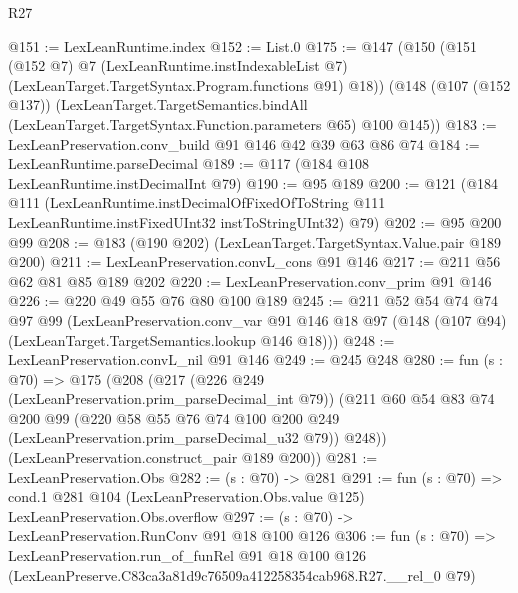 \begin{lexlean}{R27}
\begin{coremodule}
@151 := LexLeanRuntime.index
@152 := List.{0}
@175 := @147
    (@150
      (@151
        (@152 @7)
        @7
        (LexLeanRuntime.instIndexableList @7)
        (LexLeanTarget.TargetSyntax.Program.functions @91)
        @18))
    (@148
      (@107 (@152 @137))
      (LexLeanTarget.TargetSemantics.bindAll
        (LexLeanTarget.TargetSyntax.Function.parameters @65)
        @100
        @145))
@183 := LexLeanPreservation.conv_build @91 @146 @42 @39 @63 @86 @74
@184 := LexLeanRuntime.parseDecimal
@189 := @117 (@184 @108 LexLeanRuntime.instDecimalInt @79)
@190 := @95 @189
@200 := @121
    (@184
      @111
      (LexLeanRuntime.instDecimalOfFixedOfToString
        @111
        LexLeanRuntime.instFixedUInt32
        instToStringUInt32)
      @79)
@202 := @95 @200 @99
@208 := @183 (@190 @202) (LexLeanTarget.TargetSyntax.Value.pair @189 @200)
@211 := LexLeanPreservation.convL_cons @91 @146
@217 := @211 @56 @62 @81 @85 @189 @202
@220 := LexLeanPreservation.conv_prim @91 @146
@226 := @220 @49 @55 @76 @80 @100 @189
@245 := @211
    @52
    @54
    @74
    @74
    @97
    @99
    (LexLeanPreservation.conv_var
      @91
      @146
      @18
      @97
      (@148 (@107 @94) (LexLeanTarget.TargetSemantics.lookup @146 @18)))
@248 := LexLeanPreservation.convL_nil @91 @146
@249 := @245 @248
@280 := fun (s : @70) =>
  @175
    (@208
      (@217
        (@226 @249 (LexLeanPreservation.prim_parseDecimal_int @79))
        (@211
          @60
          @54
          @83
          @74
          @200
          @99
          (@220 @58 @55 @76 @74 @100 @200 @249 (LexLeanPreservation.prim_parseDecimal_u32 @79))
          @248))
      (LexLeanPreservation.construct_pair @189 @200))
@281 := LexLeanPreservation.Obs
@282 := (s : @70) -> @281
@291 := fun (s : @70) =>
  cond.{1} @281 @104 (LexLeanPreservation.Obs.value @125) LexLeanPreservation.Obs.overflow
@297 := (s : @70) -> LexLeanPreservation.RunConv @91 @18 @100 @126
@306 := fun (s : @70) =>
  LexLeanPreservation.run_of_funRel
    @91
    @18
    @100
    @126
    (LexLeanPreserve.C83ca3a81d9c76509a412258354cab968.R27.__rel_0 @79)
\end{coremodule}
\end{lexlean}
